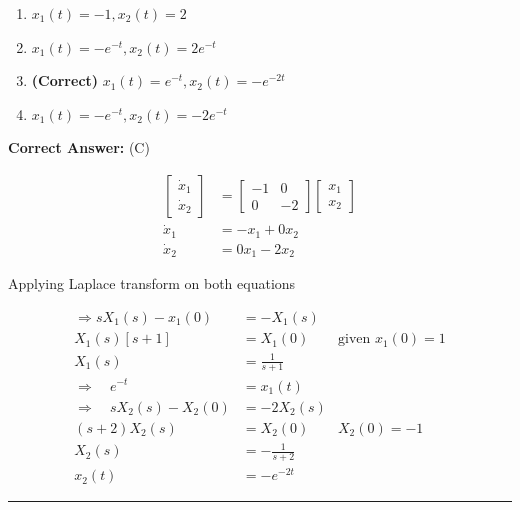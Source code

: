 \documentclass[11pt,a4paper]{article}
\begin{document}
\begin{enumerate}[label=(\Alph*)]
    \item $x_{1}(t)=-1, x_{2}(t)=2$
    \item $x_{1}(t)=-e^{-t}, x_{2}(t)=2e^{-t}$
    \item \textbf{(Correct)} $x_{1}(t)=e^{-t}, x_{2}(t)=-e^{-2t}$
    \item $x_{1}(t)=-e^{-t}, x_{2}(t)=-2e^{-t}$
\end{enumerate}

\noindent \textbf{Correct Answer:} (C)

\begin{tcolorbox}[solbox, title=Detailed Solution -- Question 101]
\[
\begin{aligned}\left[\begin{array}{l}\dot{x}_{1} \\ \dot{x}_{2}\end{array}\right] &=\left[\begin{array}{cc}-1 & 0 \\ 0 & -2\end{array}\right]\left[\begin{array}{l}x_{1} \\ x_{2}\end{array}\right] \\ \dot{x}_{1} &=-x_{1}+0 x_{2} \\ \dot{x}_{2} &=0 x_{1}-2 x_{2} \end{aligned}
\]

 Applying Laplace transform on both equations 

\[
\begin{aligned} \Rightarrow s X_{1}(s)-x_{1}(0)&=-X_{1}(s) \\ X_{1}(s)[s+1]&=X_{1}(0) \quad &\text{given }x_{1}(0)=1 \\ X_{1}(s)&=\frac{1}{s+1} \\ \Rightarrow \quad e^{-t}&=x_{1}(t)\\ \Rightarrow \quad s X_{2}(s)-X_{2}(0)&=-2 X_{2}(s) \\ (s+2) X_{2}(s)&=X_{2}(0) &X_{2}(0)=-1 \\ X_{2}(s)&=-\frac{1}{s+2} \\ x_{2}(t)&=-e^{-2 t} \end{aligned}
\]
\end{tcolorbox}

\vspace{1.5em}
\hrule
\vspace{1.5em}
\end{document}
